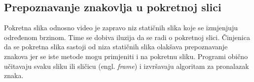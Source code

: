 \subsection{Prepoznavanje znakovlja u pokretnoj slici} %

Pokretna slika odnosno video je zapravo niz statičnih slika 
koje se izmjenjuju određenom brzinom. Time se dobiva iluzija da se 
radi o pokretnoj slici. Činjenica da se pokretna slika sastoji od
niza statičnih slika olakšava prepoznavanje 
znakova jer se iste metode mogu primjeniti i na pokretnu sliku. 
Programi obično učitavaju svaku sliku ili sličicu (engl. \textit{frame}) i izvršavaju algoritam za pronalazak znaka.

